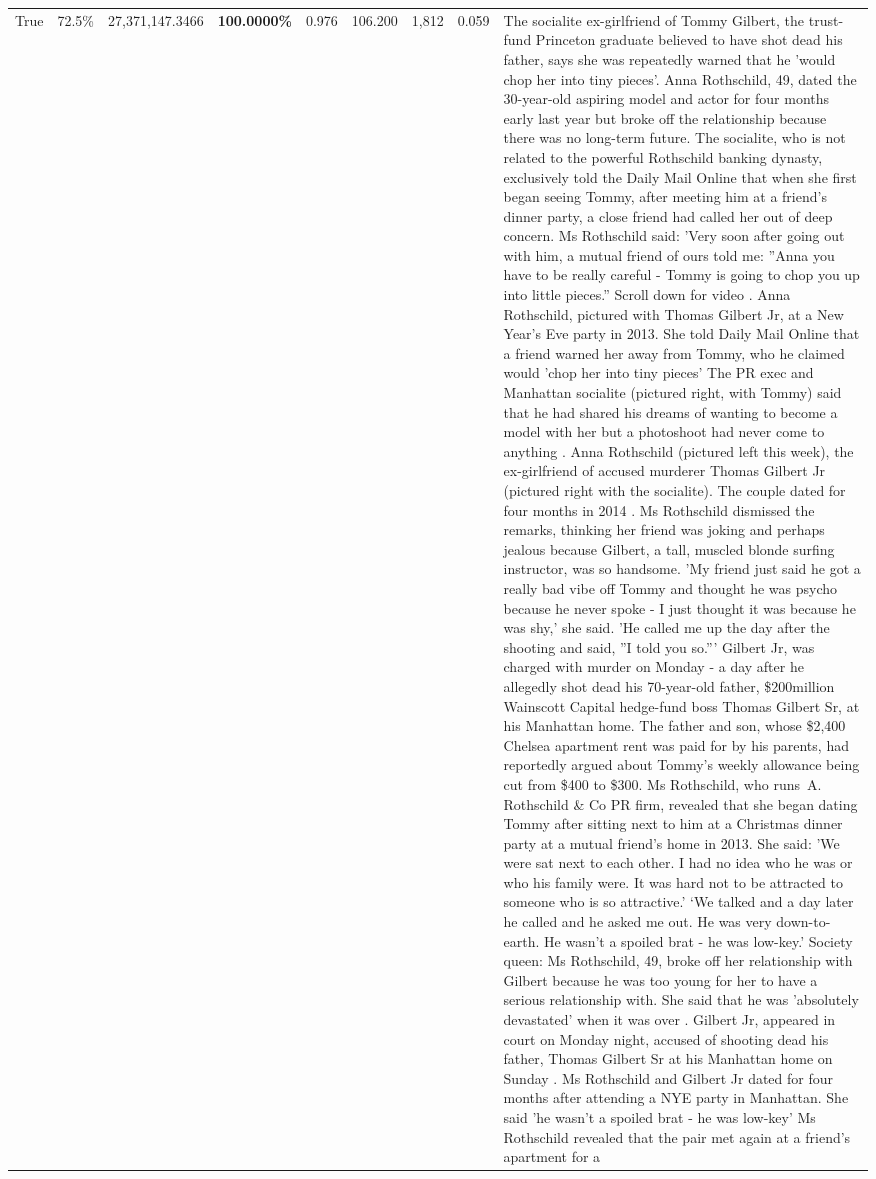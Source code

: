 \begin{table}[H]
\begin{tabular}{lllrlllll}
True & 72.5\% & 27,371,147.3466 & \bfseries \color{red} 100.0000\% & 0.976 & 106.200 & 1,812 & 0.059 & The socialite ex-girlfriend of Tommy Gilbert, the trust-fund Princeton graduate believed to have shot dead his father, says she was repeatedly warned that he 'would chop her into tiny pieces'. Anna Rothschild, 49, dated the 30-year-old aspiring model and actor for four months early last year but broke off the relationship because there was no long-term future. The socialite, who is not related to the powerful Rothschild banking dynasty, exclusively told the Daily Mail Online that when she first began seeing Tommy, after meeting him at a friend's dinner party, a close friend had called her out of deep concern. Ms Rothschild said: 'Very soon after going out with him, a mutual friend of ours told me: ''Anna you have to be really careful - Tommy is going to chop you up into little pieces.'' Scroll down for video . Anna Rothschild, pictured with Thomas Gilbert Jr, at a New Year's Eve party in 2013. She told Daily Mail Online that a friend warned her away from Tommy, who he claimed would 'chop her into tiny pieces' The PR exec and Manhattan socialite (pictured right, with Tommy) said that he had shared his dreams of wanting to become a model with her but a photoshoot had never come to anything . Anna Rothschild (pictured left this week), the ex-girlfriend of accused murderer Thomas Gilbert Jr (pictured right with the socialite). The couple dated for four months in 2014 . Ms Rothschild dismissed the remarks, thinking her friend was joking and perhaps jealous because Gilbert, a tall, muscled blonde surfing instructor, was so handsome. 'My friend just said he got a really bad vibe off Tommy and thought he was psycho because he never spoke - I just thought it was because he was shy,' she said. 'He called me up the day after the shooting and said, ''I told you so.''' Gilbert Jr, was charged with murder on Monday - a day after he allegedly shot dead his 70-year-old father, \$200million Wainscott Capital hedge-fund boss Thomas Gilbert Sr, at his Manhattan home. The father and son, whose \$2,400 Chelsea apartment rent was paid for by his parents, had reportedly argued about Tommy's weekly allowance being cut from \$400 to \$300. Ms Rothschild, who runs A. Rothschild \& Co PR firm, revealed that she began dating Tommy after sitting next to him at a Christmas dinner party at a mutual friend's home in 2013. She said: 'We were sat next to each other. I had no idea who he was or who his family were. It was hard not to be attracted to someone who is so attractive.' ‘We talked and a day later he called and he asked me out. He was very down-to-earth. He wasn’t a spoiled brat - he was low-key.’ Society queen: Ms Rothschild, 49, broke off her relationship with Gilbert because he was too young for her to have a serious relationship with. She said that he was 'absolutely devastated' when it was over . Gilbert Jr, appeared in court on Monday night, accused of shooting dead his father, Thomas Gilbert Sr at his Manhattan home on Sunday . Ms Rothschild and Gilbert Jr dated for four months after attending a NYE party in Manhattan. She said 'he wasn't a spoiled brat - he was low-key' Ms Rothschild revealed that the pair met again at a friend’s apartment for a 
\end{tabular}
\end{table}
